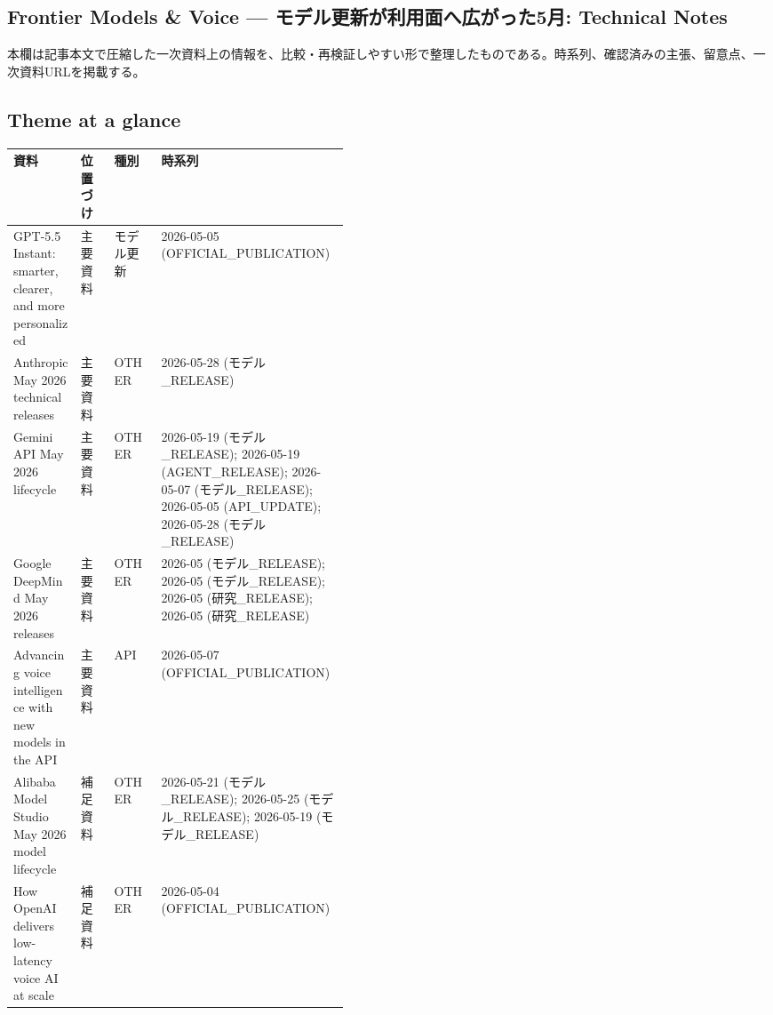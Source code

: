 \subsection*{Frontier Models \& Voice — モデル更新が利用面へ広がった5月: Technical Notes}
本欄は記事本文で圧縮した一次資料上の情報を、比較・再検証しやすい形で整理したものである。時系列、確認済みの主張、留意点、一次資料URLを掲載する。
\medskip
\subsection*{Theme at a glance}
\begin{center}
\footnotesize
\begin{tabularx}{\linewidth}{@{}p{0.20\linewidth}p{0.10\linewidth}p{0.14\linewidth}X@{}}
\toprule
資料 & 位置づけ & 種別 & 時系列 \\
\midrule
GPT-5.5 Instant: smarter, clearer, and more personalized & 主要資料 & モデル更新 & 2026-05-05 (OFFICIAL\_PUBLICATION) \\
Anthropic May 2026 technical releases & 主要資料 & OTHER & 2026-05-28 (モデル\_RELEASE) \\
Gemini API May 2026 lifecycle & 主要資料 & OTHER & 2026-05-19 (モデル\_RELEASE); 2026-05-19 (AGENT\_RELEASE); 2026-05-07 (モデル\_RELEASE); 2026-05-05 (API\_UPDATE); 2026-05-28 (モデル\_RELEASE) \\
Google DeepMind May 2026 releases & 主要資料 & OTHER & 2026-05 (モデル\_RELEASE); 2026-05 (モデル\_RELEASE); 2026-05 (研究\_RELEASE); 2026-05 (研究\_RELEASE) \\
Advancing voice intelligence with new models in the API & 主要資料 & API & 2026-05-07 (OFFICIAL\_PUBLICATION) \\
Alibaba Model Studio May 2026 model lifecycle & 補足資料 & OTHER & 2026-05-21 (モデル\_RELEASE); 2026-05-25 (モデル\_RELEASE); 2026-05-19 (モデル\_RELEASE) \\
How OpenAI delivers low-latency voice AI at scale & 補足資料 & OTHER & 2026-05-04 (OFFICIAL\_PUBLICATION) \\
\bottomrule
\end{tabularx}
\end{center}
\normalsize

